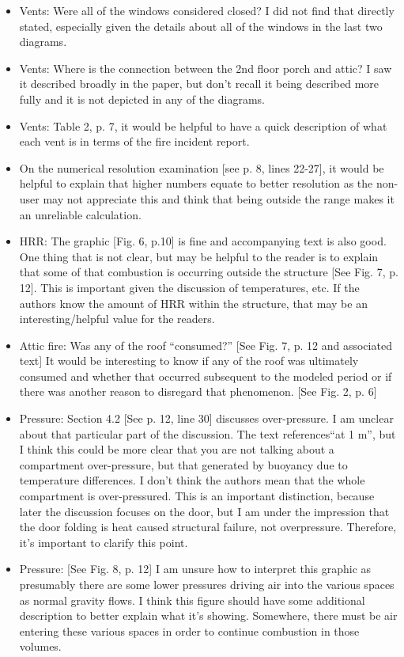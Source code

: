 \documentclass[12pt]{article}
\begin{document}
\begin{itemize}
\item Vents: Were all of the windows considered closed? I did not find that directly stated, especially given the details about all of the windows in the last two diagrams.
\item Vents: Where is the connection between the 2nd floor porch and attic? I saw it described broadly in the paper, but don't recall it being described more fully and it is not depicted in any of the diagrams.
\item Vents: Table 2, p. 7, it would be helpful to have a quick description of what each vent is in terms of the fire incident report.
\item On the numerical resolution examination [see p. 8, lines 22-27], it would be helpful to explain that higher numbers equate to better resolution as the non-user may not appreciate this and think that being outside the range makes it an unreliable calculation.
\item HRR: The graphic [Fig. 6, p.10] is fine and accompanying text is also good. One thing that is not clear, but may be helpful to the reader is to explain that some of that combustion is occurring outside the structure [See Fig. 7, p. 12]. This is important given the discussion of temperatures, etc. If the authors know the amount of HRR within the structure, that may be an interesting/helpful value for the readers.
\item Attic fire: Was any of the roof ``consumed?'' [See Fig. 7, p. 12 and associated text] It would be interesting to know if any of the roof was ultimately consumed and whether that occurred subsequent to the modeled period or if there was another reason to disregard that phenomenon. [See Fig. 2, p. 6]
\item Pressure: Section 4.2 [See p. 12, line 30] discusses over-pressure. I am unclear about that particular part of the discussion. The text references``at 1 m'', but I think this could be more clear that you are not talking about a compartment over-pressure, but that generated by buoyancy due to temperature differences. I don't think the authors mean that the whole compartment is over-pressured. This is an important distinction, because later the discussion focuses on the door, but I am under the impression that the door folding is heat caused structural failure, not overpressure. Therefore, it's important to clarify this point.
\item Pressure: [See Fig. 8, p. 12] I am unsure how to interpret this graphic as presumably there are some lower pressures driving air into the various spaces as normal gravity flows. I think this figure should have some additional description to better explain what it's showing. Somewhere, there must be air entering these various spaces in order to continue combustion in those volumes.

\end{itemize}
\end{document}
